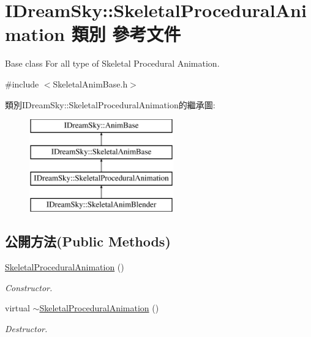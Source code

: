 \hypertarget{class_i_dream_sky_1_1_skeletal_procedural_animation}{}\section{I\+Dream\+Sky\+:\+:Skeletal\+Procedural\+Animation 類別 參考文件}
\label{class_i_dream_sky_1_1_skeletal_procedural_animation}


Base class For all type of Skeletal Procedural Animation.  




{\ttfamily \#include $<$Skeletal\+Anim\+Base.\+h$>$}

類別\+I\+Dream\+Sky\+:\+:Skeletal\+Procedural\+Animation的繼承圖\+:\begin{figure}[H]
\begin{center}
\leavevmode
\includegraphics[height=4.000000cm]{class_i_dream_sky_1_1_skeletal_procedural_animation}
\end{center}
\end{figure}
\subsection*{公開方法(Public Methods)}
\begin{DoxyCompactItemize}
\item 
\hyperlink{class_i_dream_sky_1_1_skeletal_procedural_animation_af2ce8355f5a55bc8078e6470ac456a1b}{Skeletal\+Procedural\+Animation} ()\hypertarget{class_i_dream_sky_1_1_skeletal_procedural_animation_af2ce8355f5a55bc8078e6470ac456a1b}{}\label{class_i_dream_sky_1_1_skeletal_procedural_animation_af2ce8355f5a55bc8078e6470ac456a1b}

\begin{DoxyCompactList}\small\item\em Constructor. \end{DoxyCompactList}\item 
virtual \hyperlink{class_i_dream_sky_1_1_skeletal_procedural_animation_ae312fff340c8e7d16ecf757fc186dea9}{$\sim$\+Skeletal\+Procedural\+Animation} ()\hypertarget{class_i_dream_sky_1_1_skeletal_procedural_animation_ae312fff340c8e7d16ecf757fc186dea9}{}\label{class_i_dream_sky_1_1_skeletal_procedural_animation_ae312fff340c8e7d16ecf757fc186dea9}

\begin{DoxyCompactList}\small\item\em Destructor. \end{DoxyCompactList}\end{DoxyCompactItemize}
